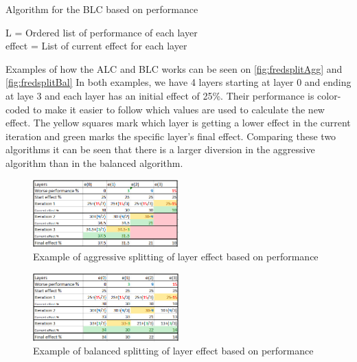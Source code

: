 \begin{algorithm}
    \caption{Algorithm for the BLC based on performance}
    \SetAlgoLined
    L = Ordered list of performance of each layer \\
    effect  = List of current effect for each layer \\
    \label{alg:bal-layereffect}
\end{algorithm}
Examples of how the ALC and BLC works can be seen on \autoref{fig:fredsplitAgg} and \autoref{fig:fredsplitBal}
In both examples, we have 4 layers starting at layer 0 and ending at laye 3 and each layer has an initial effect of 25\%.
Their performance is color-coded to make it easier to follow which values are used to calculate the new effect.
The yellow squares mark which layer is getting a lower effect in the current iteration and green marks the specific layer's final effect.
Comparing these two algorithms it can be seen that there is a larger diversion in the aggressive algorithm than in the balanced algorithm.

\begin{figure}
    \includegraphics[width=0.5\textwidth]{figures/fredsplit/aggresiveAlgo.png}
    \centering
    \caption{Example of aggressive splitting of layer effect based on performance}
    \label{fig:fredsplitAgg}
\end{figure}

\begin{figure}
    \includegraphics[width=0.5\textwidth]{figures/fredsplit/balancedAlgo.png}
    \centering
    \caption{Example of balanced splitting of layer effect based on performance}
    \label{fig:fredsplitBal}
\end{figure}


